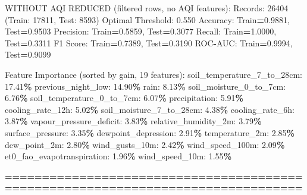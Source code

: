 \documentclass[
  letterpaper,
  DIV=11,
  numbers=noendperiod]{scrartcl}
\newenvironment{Shaded}{\begin{snugshade}}{\end{snugshade}}
\newcommand{\BuiltInTok}[1]{#1}
\newcommand{\DecValTok}[1]{\textcolor[rgb]{0.00,0.00,0.81}{#1}}
\newcommand{\FloatTok}[1]{\textcolor[rgb]{0.00,0.00,0.81}{#1}}
\newcommand{\NormalTok}[1]{#1}
\newcommand{\OperatorTok}[1]{\textcolor[rgb]{0.81,0.36,0.00}{\textbf{#1}}}
\begin{document}
\begin{Shaded}
\begin{Highlighting}[]
\NormalTok{WITHOUT AQI REDUCED (filtered rows, no AQI features):}
\NormalTok{  Records: }\DecValTok{26404}\NormalTok{ (Train: }\DecValTok{17811}\NormalTok{, Test: }\DecValTok{8593}\NormalTok{)}
\NormalTok{  Optimal Threshold: }\FloatTok{0.550}
\NormalTok{  Accuracy: Train}\OperatorTok{=}\FloatTok{0.9881}\NormalTok{, Test}\OperatorTok{=}\FloatTok{0.9503}
\NormalTok{  Precision: Train}\OperatorTok{=}\FloatTok{0.5859}\NormalTok{, Test}\OperatorTok{=}\FloatTok{0.3077}
\NormalTok{  Recall: Train}\OperatorTok{=}\FloatTok{1.0000}\NormalTok{, Test}\OperatorTok{=}\FloatTok{0.3311}
\NormalTok{  F1 Score: Train}\OperatorTok{=}\FloatTok{0.7389}\NormalTok{, Test}\OperatorTok{=}\FloatTok{0.3190}
\NormalTok{  ROC}\OperatorTok{{-}}\NormalTok{AUC: Train}\OperatorTok{=}\FloatTok{0.9994}\NormalTok{, Test}\OperatorTok{=}\FloatTok{0.9099}

\NormalTok{  Feature Importance (}\BuiltInTok{sorted}\NormalTok{ by gain, }\DecValTok{19}\NormalTok{ features):}
\NormalTok{    soil\_temperature\_7\_to\_28cm: }\FloatTok{17.41}\OperatorTok{\%}
\NormalTok{    previous\_night\_low: }\FloatTok{14.90}\OperatorTok{\%}
\NormalTok{    rain: }\FloatTok{8.13}\OperatorTok{\%}
\NormalTok{    soil\_moisture\_0\_to\_7cm: }\FloatTok{6.76}\OperatorTok{\%}
\NormalTok{    soil\_temperature\_0\_to\_7cm: }\FloatTok{6.07}\OperatorTok{\%}
\NormalTok{    precipitation: }\FloatTok{5.91}\OperatorTok{\%}
\NormalTok{    cooling\_rate\_12h: }\FloatTok{5.02}\OperatorTok{\%}
\NormalTok{    soil\_moisture\_7\_to\_28cm: }\FloatTok{4.38}\OperatorTok{\%}
\NormalTok{    cooling\_rate\_6h: }\FloatTok{3.87}\OperatorTok{\%}
\NormalTok{    vapour\_pressure\_deficit: }\FloatTok{3.83}\OperatorTok{\%}
\NormalTok{    relative\_humidity\_2m: }\FloatTok{3.79}\OperatorTok{\%}
\NormalTok{    surface\_pressure: }\FloatTok{3.35}\OperatorTok{\%}
\NormalTok{    dewpoint\_depression: }\FloatTok{2.91}\OperatorTok{\%}
\NormalTok{    temperature\_2m: }\FloatTok{2.85}\OperatorTok{\%}
\NormalTok{    dew\_point\_2m: }\FloatTok{2.80}\OperatorTok{\%}
\NormalTok{    wind\_gusts\_10m: }\FloatTok{2.42}\OperatorTok{\%}
\NormalTok{    wind\_speed\_100m: }\FloatTok{2.09}\OperatorTok{\%}
\NormalTok{    et0\_fao\_evapotranspiration: }\FloatTok{1.96}\OperatorTok{\%}
\NormalTok{    wind\_speed\_10m: }\FloatTok{1.55}\OperatorTok{\%}

\OperatorTok{================================================================================}


\end{Highlighting}
\end{Shaded}
\end{document}

